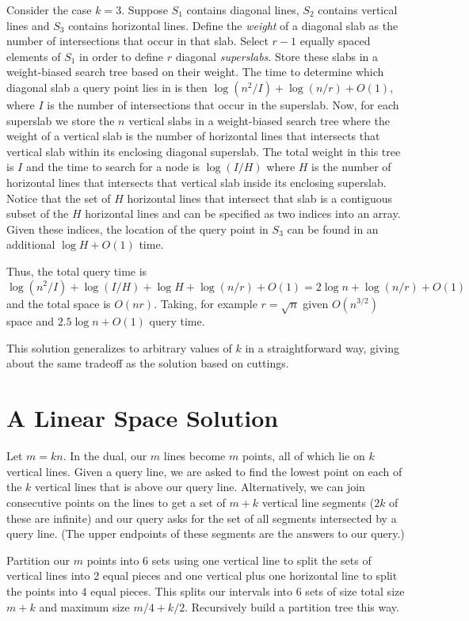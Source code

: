 \documentclass{article}
\begin{document}
Consider the case $k=3$.  Suppose $S_1$ contains diagonal lines, $S_2$
contains vertical lines and $S_3$ contains horizontal lines. Define
the \emph{weight} of a diagonal slab as the number of intersections
that occur in that slab.  Select $r-1$ equally spaced elements of
$S_1$ in order to define $r$ diagonal \emph{superslabs}.  Store these
slabs in a weight-biased search tree based on their weight.  The time
to determine which diagonal slab a query point lies in is then $\log
(n^2/I) + \log (n/r) + O(1)$, where $I$ is the number of intersections
that occur in the superslab.  Now, for each superslab we store the $n$
vertical slabs in a weight-biased search tree where the weight of a
vertical slab is the number of horizontal lines that intersects that
vertical slab within its enclosing diagonal superslab.  The total
weight in this tree is $I$ and the time to search for a node is $\log
(I/H)$ where $H$ is the number of horizontal lines that intersects
that vertical slab inside its enclosing superslab. Notice that the set
of $H$ horizontal lines that intersect that slab is a contiguous
subset of the $H$ horizontal lines and can be specified as two indices
into an array.  Given these indices, the location of the query point
in $S_3$ can be found in an additional $\log H + O(1)$ time.

Thus, the total query time is $\log (n^2/I) + \log(I/H) + \log H +
\log (n/r)+O(1)= 2\log n+\log(n/r)+O(1)$ and the total space is
$O(nr)$.  Taking, for example $r=\sqrt{n}$ given $O(n^{3/2})$ space
and $2.5\log n + O(1)$ query time.

This solution generalizes to arbitrary values of $k$ in a
straightforward way, giving about the same tradeoff as the solution
based on cuttings.

\section{A Linear Space Solution}

Let $m=kn$. In the dual, our $m$ lines become $m$ points, all of which
lie on $k$ vertical lines.  Given a query line, we are asked to find
the lowest point on each of the $k$ vertical lines that is above our
query line.  Alternatively, we can join consecutive points on the
lines to get a set of $m+k$ vertical line segments ($2k$ of these are
infinite) and our query asks for the set of all segments intersected
by a query line.  (The upper endpoints of these segments are the
answers to our query.)

Partition our $m$ points into 6 sets using one vertical line to split
the sets of vertical lines into 2 equal pieces and one vertical plus
one horizontal line to split the points into $4$ equal pieces.  This
splits our intervals into 6 sets of size total size $m+k$ and maximum
size $m/4+k/2$.  Recursively build a partition tree this way.  
\end{document}
